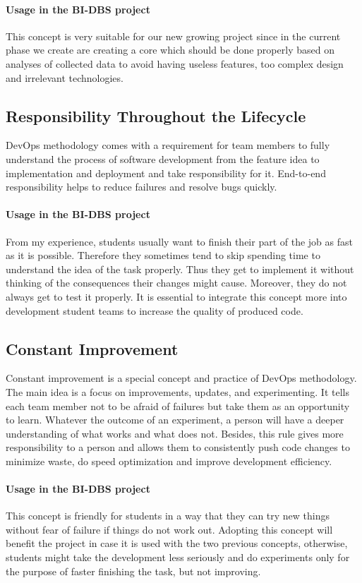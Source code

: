 \paragraph*{Usage in the BI-DBS project} This concept is very suitable for our new growing project since in the current phase we create are creating a core which should be done properly based on analyses of collected data to avoid having useless features, too complex design and irrelevant technologies.

\subsection{Responsibility Throughout the Lifecycle} DevOps methodology comes with a requirement for team members to fully understand the process of software development from the feature idea to implementation and deployment and take responsibility for it. End-to-end responsibility helps to reduce failures and resolve bugs quickly.

\paragraph*{Usage in the BI-DBS project} From my experience, students usually want to finish their part of the job as fast as it is possible. Therefore they sometimes tend to skip spending time to understand the idea of the task properly. Thus they get to implement it without thinking of the consequences their changes might cause. Moreover, they do not always get to test it properly. It is essential to integrate this concept more into development student teams to increase the quality of produced code.

\subsection{Constant Improvement} Constant improvement is a special concept and practice of DevOps methodology. The main idea is a focus on improvements, updates, and experimenting. It tells each team member not to be afraid of failures but take them as an opportunity to learn. Whatever the outcome of an experiment, a person will have a deeper understanding of what works and what does not. Besides, this rule gives more responsibility to a person and allows them to consistently push code changes to minimize waste, do speed optimization and improve development efficiency.

\paragraph*{Usage in the BI-DBS project} This concept is friendly for students in a way that they can try new things without fear of failure if things do not work out. Adopting this concept will benefit the project in case it is used with the two previous concepts, otherwise, students might take the development less seriously and do experiments only for the purpose of faster finishing the task, but not improving.

